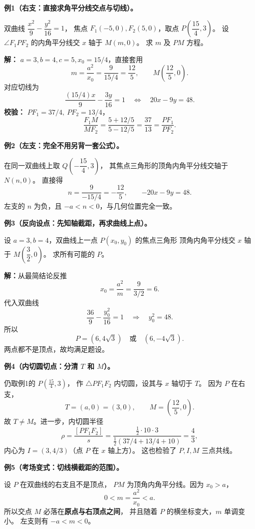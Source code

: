 \clearpage
\begin{examplebox}

\textbf{例1（右支：直接求角平分线交点与切线）。}

双曲线 $\dfrac{x^2}{9}-\dfrac{y^2}{16}=1$，
焦点 $F_1(-5,0),F_2(5,0)$，取点
$P\left(\dfrac{15}{4},3\right)$。
设 $\angle F_1PF_2$ 的内角平分线交 $x$ 轴于 $M(m,0)$。
求 $m$ 及 $PM$ 方程。

\textbf{解：} $a=3,b=4,c=5,x_0=15/4$，直接套用
\[
m=\frac{a^2}{x_0}=\frac{9}{15/4}=\boxed{\frac{12}{5}},
\qquad\boxed{M\left(\frac{12}{5},0\right)}.
\]
对应切线为
\[
\frac{(15/4)x}{9}-\frac{3y}{16}=1
\quad\Longleftrightarrow\quad
\boxed{20x-9y=48}.
\]
\textbf{校验：} $PF_1=37/4,\ PF_2=13/4$，
\[
\frac{F_1M}{MF_2}
=\frac{5+12/5}{5-12/5}=\frac{37}{13}
=\frac{PF_1}{PF_2}.
\]

\medskip
\textbf{例2（左支：完全不用另背一套公式）。}

在同一双曲线上取 $Q\left(-\dfrac{15}{4},3\right)$，
其焦点三角形的顶角内角平分线交轴于 $N(n,0)$。
直接得
\[
\boxed{n=\frac{9}{-15/4}=-\frac{12}{5}},
\qquad\boxed{-20x-9y=48}.
\]
左支的 $n$ 为负，且 $-a<n<0$，与几何位置完全一致。

\medskip
\end{examplebox}
\clearpage
\begin{examplebox}

\textbf{例3（反向设点：先知轴截距，再求曲线上点）。}

设 $a=3,b=4$，双曲线上一点 $P(x_0,y_0)$ 的焦点三角形
顶角内角平分线交 $x$ 轴于 $M\left(\dfrac32,0\right)$。
求所有可能的 $P$。

\textbf{解：}从最简结论反推
\[
x_0=\frac{a^2}{m}=\frac{9}{3/2}=6.
\]
代入双曲线
\[
\frac{36}{9}-\frac{y_0^2}{16}=1
\quad\Longrightarrow\quad y_0^2=48.
\]
所以
\[
\boxed{P=(6,4\sqrt3)\quad\text{或}\quad(6,-4\sqrt3)}.
\]
两点都不是顶点，故均满足题设。

\medskip
\end{examplebox}
\clearpage
\begin{examplebox}
\textbf{例4（内切圆切点：分清 $T$ 和 $M$）。}

仍取例1的 $P\left(\frac{15}{4},3\right)$，
作 $\triangle PF_1F_2$ 内切圆，设其与 $x$ 轴切于 $T$。
因为 $P$ 在右支，
\[
\boxed{T=(a,0)=(3,0)},\qquad
\boxed{M=\left(\frac{12}{5},0\right)}.
\]
故 $T\ne M$。进一步，内切圆半径
\[
\rho=\frac{[PF_1F_2]}{s}
=\frac{\frac12\cdot10\cdot3}{\frac12(37/4+13/4+10)}
=\boxed{\frac43},
\]
内心为 $I=(3,4/3)$（点 $P$ 在 $x$ 轴上方）。
这也检验了 $P,I,M$ 三点共线。

\medskip
\textbf{例5（考场变式：切线横截距的范围）。}

设 $P$ 在双曲线的右支且不是顶点，
$PM$ 为顶角内角平分线。因为 $x_0>a$，
\[
0<m=\frac{a^2}{x_0}<a.
\]
所以交点 $M$ 必落在\textbf{原点与右顶点之间}，
并且随着 $P$ 的横坐标变大，$m$ 单调变小。
左支则有 $-a<m<0$。
\end{examplebox}


